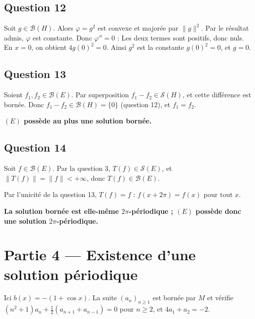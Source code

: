 \documentclass[11pt,a4paper]{article}
\newcommand{\equationajustee}[1]{%
  \sbox{\boiteequation}{$\displaystyle #1$}%
  \ifdim\wd\boiteequation>\linewidth
    \[\resizebox{\linewidth}{!}{\usebox{\boiteequation}}\]%
  \else
    \[#1\]%
  \fi}
\begin{document}
\hypertarget{question-12}{%
\subsection{Question 12}\label{question-12}}

Soit \(g\in\mathcal B(H)\). Alors \(\varphi=g^2\) est convexe et majorée par \(\|g\|^2\). Par le résultat admis, \(\varphi\) est constante. Donc \(\varphi''=0\) :
\equationajustee{\forall x\in\mathbb R,\quad 2g'(x)^2+2(1+\cos x)g(x)^2=0.}
Les deux termes sont positifs, donc nuls. En \(x=0\), on obtient \(4g(0)^2=0\). Ainsi \(g^2\) est la constante \(g(0)^2=0\), et \(g=0\).

\equationajustee{\boxed{\mathcal B(H)=\{0\}.}}

\hypertarget{question-13}{%
\subsection{Question 13}\label{question-13}}

Soient \(f_1,f_2\in\mathcal B(E)\). Par superposition \(f_1-f_2\in\mathcal S(H)\), et cette différence est bornée. Donc \(f_1-f_2\in\mathcal B(H)=\{0\}\) (question 12), et \(f_1=f_2\).

\textbf{\((E)\) possède au plus une solution bornée.}

\hypertarget{question-14}{%
\subsection{Question 14}\label{question-14}}

Soit \(f\in\mathcal B(E)\). Par la question 3, \(T(f)\in\mathcal S(E)\), et \(\|T(f)\|=\|f\|<+\infty\), donc \(T(f)\in\mathcal B(E)\).

Par l'unicité de la question 13, \(T(f)=f\) : \(f(x+2\pi)=f(x)\) pour tout \(x\).

\textbf{La solution bornée est elle-même \(2\pi\)-périodique ; \((E)\) possède donc une solution \(2\pi\)-périodique.}

\hypertarget{partie-4-existence-dune-solution-puxe9riodique}{%
\section{Partie 4 --- Existence d'une solution périodique}\label{partie-4-existence-dune-solution-puxe9riodique}}

Ici \(b(x)=-(1+\cos x)\). La suite \((a_n)_{n\ge1}\) est bornée par \(M\) et vérifie \((n^2+1)a_n+\frac12(a_{n+1}+a_{n-1})=0\) pour \(n\ge2\), et \(4a_1+a_2=-2\).
\end{document}
